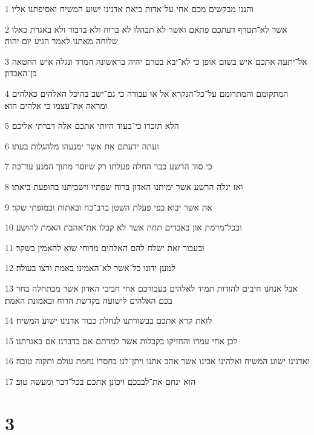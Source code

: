\par 1 והננו מבקשים מכם אחי על־אדות ביאת אדנינו ישוע המשיח ואסיפתנו אליו׃
\par 2 אשר לא־תטרף דעתכם פתאם ואשר לא תבהלו לא ברוח ולא בדבור ולא באגרת כאלו שלוחה מאתנו לאמר הגיע יום יהוה׃
\par 3 אל־יתעה אתכם איש בשום אופן כי לא־יבא בטרם יהיה בראשונה המרד ונגלה איש החטאה בן־האבדון׃
\par 4 המתקומם והמתרומם על־כל־הנקרא אל או עבודה כי גם־ישב בהיכל האלהים כאלהים ומראה את־עצמו כי אלהים הוא׃
\par 5 הלא תזכרו כי־בעוד היותי אתכם אלה דברתי אליכם׃
\par 6 ועתה ידעתם את אשר ימנעהו מלהגלות בעתו׃
\par 7 כי סוד הרשע כבר החלה פעלתו רק שיוסר מתוך המנע עד־כה׃
\par 8 ואז יגלה הרשע אשר ימיתנו האדון ברוח שפתיו וישביתנו בהופעת ביאתו׃
\par 9 את אשר יבוא כפי פעלת השטן ברב־כח ובאתות ובמופתי שקר׃
\par 10 ובכל־מרמת און באבדים תחת אשר לא קבלו את־אהבת האמת להושע׃
\par 11 ובעבור זאת ישלח להם האלהים מדוחי שוא להאמין בשקר׃
\par 12 למען ידונו כל־אשר לא־האמינו באמת ורצו בעולה׃
\par 13 אבל אנחנו חיבים להודות תמיד לאלהים בעבורכם אחי חביבי האדון אשר מבתחלה בחר בכם האלהים לישועה בקדשת הרוח ובאמונת האמת׃
\par 14 לזאת קרא אתכם בבשורתנו לנחלת כבוד אדנינו ישוע המשיח׃
\par 15 לכן אחי עמדו והחזיקו בקבלות אשר למדתם אם בדברנו אם באגרתנו׃
\par 16 ואדנינו ישוע המשיח ואלהינו אבינו אשר אהב אתנו ויתן־לנו בחסדו נחמת עולם ותקוה טובה׃
\par 17 הוא ינחם את־לבבכם ויכונן אתכם בכל־דבר ומעשה טוב׃

\chapter{3}

